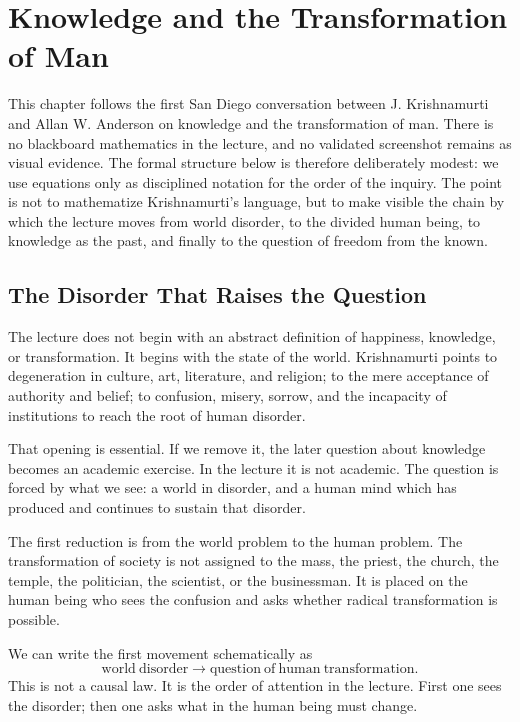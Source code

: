 \chapter{Knowledge and the Transformation of Man}

This chapter follows the first San Diego conversation between J. Krishnamurti and Allan W. Anderson on knowledge and the transformation of man. There is no blackboard mathematics in the lecture, and no validated screenshot remains as visual evidence. The formal structure below is therefore deliberately modest: we use equations only as disciplined notation for the order of the inquiry. The point is not to mathematize Krishnamurti's language, but to make visible the chain by which the lecture moves from world disorder, to the divided human being, to knowledge as the past, and finally to the question of freedom from the known.

\section{The Disorder That Raises the Question}

The lecture does not begin with an abstract definition of happiness, knowledge, or transformation. It begins with the state of the world. Krishnamurti points to degeneration in culture, art, literature, and religion; to the mere acceptance of authority and belief; to confusion, misery, sorrow, and the incapacity of institutions to reach the root of human disorder.

That opening is essential. If we remove it, the later question about knowledge becomes an academic exercise. In the lecture it is not academic. The question is forced by what we see: a world in disorder, and a human mind which has produced and continues to sustain that disorder.

The first reduction is from the world problem to the human problem. The transformation of society is not assigned to the mass, the priest, the church, the temple, the politician, the scientist, or the businessman. It is placed on the human being who sees the confusion and asks whether radical transformation is possible.

We can write the first movement schematically as
\begin{equation}
\mathrm{world\ disorder}
\longrightarrow
\mathrm{question\ of\ human\ transformation}.
\end{equation}
This is not a causal law. It is the order of attention in the lecture. First one sees the disorder; then one asks what in the human being must change.

